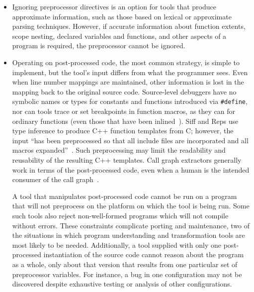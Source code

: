 \documentclass[10pt]{article}
\begin{document}
\begin{itemize}

\item Ignoring preprocessor directives is an option for tools that produce
  approximate information, such as those based on lexical or approximate
  parsing techniques.  However, if accurate information about function
  extents, scope nesting, declared variables and functions, and other
  aspects of a program is required, the preprocessor cannot be ignored.

\item Operating on post-processed code, the most common strategy, is
  simple to implement, but the tool's input differs from what the
  programmer sees.  Even when line number mappings are maintained, other
  information is lost in the mapping back to the original source code.
  Source-level debuggers have no symbolic names or types for constants and
  functions introduced via {\tt \#define}, nor can tools trace or set
  breakpoints in function macros, as they can for ordinary functions (even
  those that have been inlined~\cite{Zellweger83:TR}).  Siff and Reps use
  type inference to produce C++ function templates from C; however, the
  input ``has been preprocessed so
  that all include files are incorporated and all macros
  expanded''~\cite[p.~145]{Siff-fse96}.  Such preprocessing may limit the
  readability and reusability of the resulting C++ templates.  Call graph
  extractors generally work in terms of the post-processed code, even when
  a human is the intended consumer of the call graph~\cite{Murphy-icse18}.

  
  A tool that manipulates post-processed code cannot be run on a program
  that will not preprocess on the platform on which the tool is being run.
  Some such tools also reject non-well-formed programs which will not
  compile without errors.
  These constraints complicate porting and maintenance, two of the
  situations in which program understanding and transformation tools are
  most likely to be needed.  Additionally, a tool supplied with only one
  post-processed instantiation of the source code cannot reason about the
  program as a whole, only about that version that results from one
  particular set of preprocessor variables.  For instance, a bug in one
  configuration may not be discovered despite exhaustive testing or
  analysis of other configurations.


\end{itemize}
\end{document}
